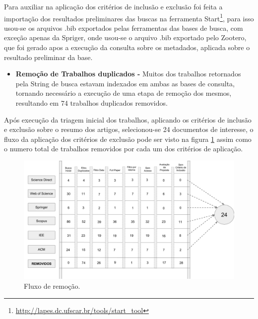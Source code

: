 \documentclass[tid,table]{texufpel} %
\begin{document}
Para auxiliar na aplicação dos critérios de inclusão e exclusão foi feita a importação dos resultados preliminares das buscas na ferramenta Start\footnote{\url{http://lapes.dc.ufscar.br/tools/start_tool}},
para isso usou-se os arquivos .bib exportados pelas ferramentas das bases de busca, com exceção apenas da Spriger, onde usou-se o arquivo .bib exportado pelo Zootero, que foi gerado apos a execução da consulta sobre os metadados, aplicada sobre o resultado preliminar da base.



\begin{itemize}
	\item  \textbf{Remoção de Trabalhos duplicados - } Muitos dos trabalhos retornados pela String de busca estavam indexados em ambas as bases de consulta, tornando necessário a execução de uma etapa de remoção dos mesmos, resultando em 74 trabalhos duplicados removidos.

\end{itemize}









Após execução da triagem inicial dos trabalhos, aplicando os critérios de inclusão e exclusão sobre o resumo dos artigos, selecionou-se 24 documentos de interesse, o fluxo da aplicação dos critérios de exclusão pode ser visto na figura \ref{fig:grafFluxoTriagemInicial} assim como o numero total de trabalhos removidos por cada um dos critérios de aplicação. 


\begin{landscape}
\begin{figure}[ht]
	\centering
	\includegraphics[width=1.7\textwidth]{imagens/FluxoTriagemInicial.png}
	\caption{Fluxo de remoção.}
	\label{fig:grafFluxoTriagemInicial}
\end{figure}
\end{landscape}
\end{document}
